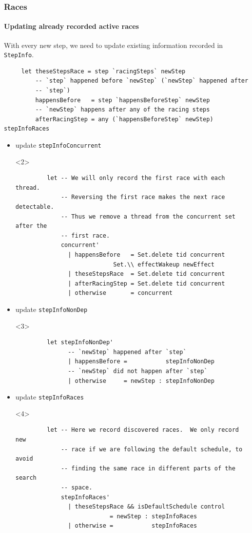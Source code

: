 \documentclass[t,x11names,xcolor={x11names},hyperref={colorlinks,citecolor=Blue4,linkcolor=Blue4,anchorcolor=Blue4,urlcolor=Blue4}]{beamer}
\begin{document}
\begin{frame}[fragile]
  \frametitle{Races}
  \framesubtitle{Updating already recorded active races}
  With every new step, we need to update existing information recorded in \texttt{StepInfo}.
  {\tiny
  \begin{verbatim}
     let theseStepsRace = step `racingSteps` newStep
         -- `step` happened before `newStep` (`newStep` happened after
         -- `step`)
         happensBefore   = step `happensBeforeStep` newStep
         -- `newStep` happens after any of the racing steps
         afterRacingStep = any (`happensBeforeStep` newStep) stepInfoRaces
  \end{verbatim}
  }
  \begin{itemize}
    \item<2-> update \texttt{stepInfoConcurrent}
      \begin{onlyenv}<2>
      \tiny
      \begin{verbatim}
         let -- We will only record the first race with each thread.
             -- Reversing the first race makes the next race detectable.
             -- Thus we remove a thread from the concurrent set after the
             -- first race.
             concurrent'
               | happensBefore   = Set.delete tid concurrent
                            Set.\\ effectWakeup newEffect
               | theseStepsRace  = Set.delete tid concurrent
               | afterRacingStep = Set.delete tid concurrent
               | otherwise       = concurrent
      \end{verbatim}
      \end{onlyenv}
    \item<3-> update \texttt{stepInfoNonDep}
      \begin{onlyenv}<3>
      \tiny
      \begin{verbatim}
         let stepInfoNonDep'
               -- `newStep` happened after `step`
               | happensBefore =           stepInfoNonDep
               -- `newStep` did not happen after `step`
               | otherwise     = newStep : stepInfoNonDep
      \end{verbatim}
      \end{onlyenv}
    \item<4-> update \texttt{stepInfoRaces}
      \begin{onlyenv}<4>
      \tiny
      \begin{verbatim}
         let -- Here we record discovered races.  We only record new
             -- race if we are following the default schedule, to avoid
             -- finding the same race in different parts of the search
             -- space.
             stepInfoRaces'
               | theseStepsRace && isDefaultSchedule control
                           = newStep : stepInfoRaces
               | otherwise =           stepInfoRaces
      \end{verbatim}
      \end{onlyenv}
  \end{itemize}
\end{frame}
\end{document}
